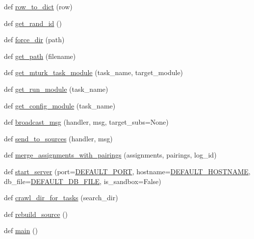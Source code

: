 \begin{DoxyCompactItemize}
\item 
def \hyperlink{namespaceparlai_1_1mturk_1_1webapp_1_1server_a92be47964fa33a4b6a14d4069d091c7d}{row\+\_\+to\+\_\+dict} (row)
\item 
def \hyperlink{namespaceparlai_1_1mturk_1_1webapp_1_1server_a762795ce59d6dbcb111fd9162a870f9f}{get\+\_\+rand\+\_\+id} ()
\item 
def \hyperlink{namespaceparlai_1_1mturk_1_1webapp_1_1server_a493aeecfa7d5201aa13a7f03cdbc59cf}{force\+\_\+dir} (path)
\item 
def \hyperlink{namespaceparlai_1_1mturk_1_1webapp_1_1server_abf5dde99069f271f98bd20e7fb7cdccd}{get\+\_\+path} (filename)
\item 
def \hyperlink{namespaceparlai_1_1mturk_1_1webapp_1_1server_a0c7e088cb9401f94297c2ae96dce3ec2}{get\+\_\+mturk\+\_\+task\+\_\+module} (task\+\_\+name, target\+\_\+module)
\item 
def \hyperlink{namespaceparlai_1_1mturk_1_1webapp_1_1server_a49eb9835228f9f47f9aa55bc6369c23f}{get\+\_\+run\+\_\+module} (task\+\_\+name)
\item 
def \hyperlink{namespaceparlai_1_1mturk_1_1webapp_1_1server_aee065cfdb6346d4815762ae793427f1e}{get\+\_\+config\+\_\+module} (task\+\_\+name)
\item 
def \hyperlink{namespaceparlai_1_1mturk_1_1webapp_1_1server_aff248adb38d13b62a05e7d5649321d64}{broadcast\+\_\+msg} (handler, msg, target\+\_\+subs=None)
\item 
def \hyperlink{namespaceparlai_1_1mturk_1_1webapp_1_1server_a12f6bdadae00003ac87686d5fd7a26df}{send\+\_\+to\+\_\+sources} (handler, msg)
\item 
def \hyperlink{namespaceparlai_1_1mturk_1_1webapp_1_1server_abe6ddbf97d0e5c26315fa927ed076489}{merge\+\_\+assignments\+\_\+with\+\_\+pairings} (assignments, pairings, log\+\_\+id)
\item 
def \hyperlink{namespaceparlai_1_1mturk_1_1webapp_1_1server_a3faf7a84baf92a6b0863ab87a0015c41}{start\+\_\+server} (port=\hyperlink{namespaceparlai_1_1mturk_1_1webapp_1_1server_ab2dbe49416f69522010b6c9a211af0e3}{D\+E\+F\+A\+U\+L\+T\+\_\+\+P\+O\+RT}, hostname=\hyperlink{namespaceparlai_1_1mturk_1_1webapp_1_1server_a2550c6dcb402e3b6b2f52229e848d6a7}{D\+E\+F\+A\+U\+L\+T\+\_\+\+H\+O\+S\+T\+N\+A\+ME}, db\+\_\+file=\hyperlink{namespaceparlai_1_1mturk_1_1webapp_1_1server_a7d1b65251987c39df64aeb32f36f6a9f}{D\+E\+F\+A\+U\+L\+T\+\_\+\+D\+B\+\_\+\+F\+I\+LE}, is\+\_\+sandbox=False)
\item 
def \hyperlink{namespaceparlai_1_1mturk_1_1webapp_1_1server_a0f5381b2282125d20fe12c40f6ed2ad3}{crawl\+\_\+dir\+\_\+for\+\_\+tasks} (search\+\_\+dir)
\item 
def \hyperlink{namespaceparlai_1_1mturk_1_1webapp_1_1server_a0ce17c85e37b7734ab2fbaca711cb45f}{rebuild\+\_\+source} ()
\item 
def \hyperlink{namespaceparlai_1_1mturk_1_1webapp_1_1server_a1919be0d74781c0b9f579daf974d9f53}{main} ()
\end{DoxyCompactItemize}
